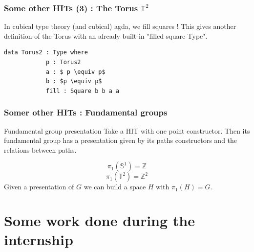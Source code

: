 \documentclass{beamer}
\begin{document}
    \begin{frame}[fragile]
        \frametitle{Some other HITs (3) : The Torus $\mathbb{T}^2$}
        In cubical type theory (and cubical) agda, we fill squares !
        \pause
        This gives another definition of the Torus with an already built-in "filled square Type".\\
        \begin{lstlisting}[mathescape=true]
            data Torus2 : Type where
            p : Torus2
            a : $ p \equiv p$
            b : $p \equiv p$
            fill : Square b b a a
        \end{lstlisting}
    \end{frame}
    \begin{frame}
        \frametitle{Somer other HITs : Fundamental groups}
        \begin{exampleblock}{Fundamental group presentation}
            Take a HIT with one point constructor. Then its fundamental group has a presentation given by its paths constructors and the relations between paths.
        \end{exampleblock}
        \pause
        $$\pi_1(\mathbb{S}^1) = \mathbb{Z}$$
        \pause
        $$\pi_1(\mathbb{T}^2) = \mathbb{Z}^2$$
        \pause
        Given a presentation of $G$ we can build a space $H$ with $\pi_1(H) = G$.
    \end{frame}
    \section{Some work done during the internship}
\end{document}
